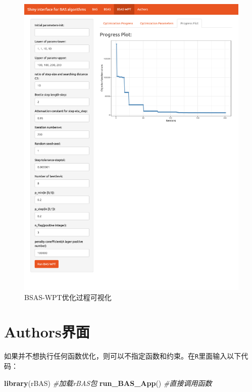 \documentclass[]{ctexbook}
\newenvironment{Shaded}{\begin{snugshade}}{\end{snugshade}}
\newcommand{\KeywordTok}[1]{\textcolor[rgb]{0.13,0.29,0.53}{\textbf{#1}}}
\newcommand{\CommentTok}[1]{\textcolor[rgb]{0.56,0.35,0.01}{\textit{#1}}}
\newcommand{\NormalTok}[1]{#1}
\theoremstyle{definition}
\theoremstyle{definition}
\theoremstyle{definition}
\theoremstyle{remark}
\begin{document}
\begin{figure}

{\centering \includegraphics[width=0.95\linewidth]{img/wpt3} 

}

\caption{BSAS-WPT优化过程可视化}\label{fig:wptplot}
\end{figure}

\section{Authors界面}\label{authors}

如果并不想执行任何函数优化，则可以不指定函数和约束。在\texttt{R}里面输入以下代码：

\begin{Shaded}
\begin{Highlighting}[]
\KeywordTok{library}\NormalTok{(rBAS) }\CommentTok{#加载rBAS包}
\KeywordTok{run_BAS_App}\NormalTok{() }\CommentTok{#直接调用函数}
\end{Highlighting}
\end{Shaded}
\end{document}

